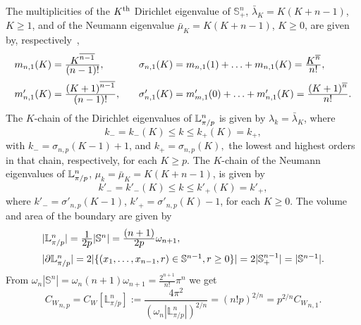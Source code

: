 \documentclass[11pt,a4paper,times]{amsart}
\theoremstyle{plain}
\theoremstyle{definition}
\numberwithin{equation}{section}
\newcommand{\ds}{\displaystyle}
\newcommand{\eqskip}{ \vspace*{2mm}\\ }
\newcommand{\Cw}{{ C_W}}
\newcommand{\fr}[2]{\frac{\ds #1}{\ds #2}}
\newcommand{\lune}[2]{\mathbb{L}^{#1}_{#2}}
\newcommand{\luned}[2]{\raisebox{0.5pt}{${}$}\mathbb{L}^{#1}_{\pi/#2}}
\newcommand{\txtg}{\textcolor{green}}
\begin{document}
{The multiplicities of the  $K^{\rm th}$  Dirichlet eigenvalue of $\mathbb{S}^n_+$, $\bar{\lambda}_K=K(K+n-1)$, $K\geq 1$, and of the
Neumann eigenvalue $\bar{\mu}_K=K(K+n-1)$, $K\geq 0$, are given by, respectively~\cite{bsj,bb},
\begin{gather}\label{hemimulti}
\begin{array}{ll}
m_{n,1}(K) = \fr{K^{\overline{n-1}}}{(n-1)!},
&\quad \sigma_{n,1}(K) = m_{n,1}(1)+\ldots + m_{n,1}(K)=  \fr{K^{\overline{n}}}{n!},\eqskip
 m'_{n,1}(K) = \fr{(K+1)^{\overline{n-1}}}{(n-1)!},&\quad
 \sigma'_{n,1}(K) = m'_{m,1}(0)+\ldots +m'_{n,1}(K)=  \fr{(K+1)^{\overline{n}}}{n!}.
 \end{array}
 \end{gather}
The $K$-chain of the Dirichlet eigenvalues of  $\luned{n}{p}$ is given by $\lambda_k=\bar{\lambda}_{K}$,   where  
 \[k_-=k_-(K)\leq k\leq k_+(K)=k_+,\]
 with $k_-=\sigma_{n,p}(K-1)+1$, and $k_+=\sigma_{n,p}(K), $ the lowest and highest orders in that chain, respectively, for each  $K\geq p$.
The $K$-chain of the Neumann eigenvalues of  $\luned{n}{p}$, 
$\mu_k=\bar{\mu}_K=K(K+n-1)$,  
 is given by 
 \[k'_-=k'_-(K)\leq k\leq 
 k'_+(K)=k'_+,\]
  where $k'_-=\sigma'_{n,p}(K-1)$, $k'_+=\sigma'_{n,p}(K)-1 $, for each $K\geq 0$.
 The volume and  area of the boundary are given by 
 \begin{equation}\label{areap}
 \begin{array}{l}
 |\lune{n}{\pi/p}|=\fr{1}{2p}|\mathbb{S}^n|=\fr{(n+1)}{2p}\omega_{n+1},\eqskip
 |\partial \lune{n}{\pi/p}| = 2|\{(x_1, \ldots, x_{n-1},r)\in \mathbb{S}^{n-1}, r\geq 0\}|=2|\mathbb{S}^{n-1}_+|=
 |\mathbb{S}^{n-1}|.
 \end{array}
 \end{equation}
From
$\omega_n |\mathbb{S}^n|=\omega_n (n+1)\omega_{n+1}=
\frac{2^{n+1}}{n!}\pi^n$ we get
\begin{equation}\label{cwp}
\Cw_{n,p}=\Cw[\lune{n}{\pi/p}]:= \frac{ 4\pi^2}{(\omega_n|\lune{n}{\pi/p}|)^{2/n}}= (n!p)^{2/n} =  p^{2/n}\Cw_{n,1}.    \end{equation}


}
\end{document}
